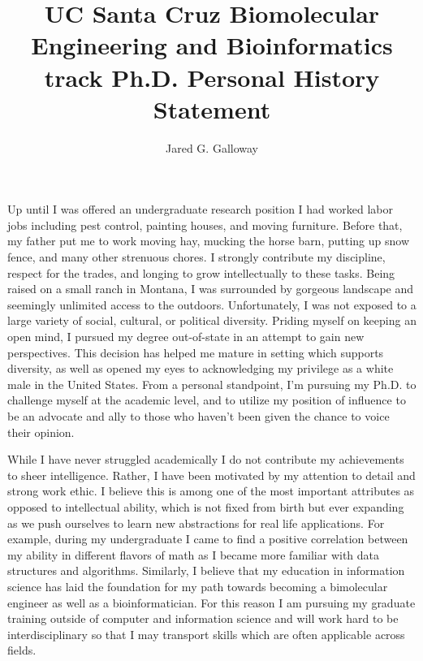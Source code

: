 \documentclass[11pt]{amsart}
\title{UC Santa Cruz Biomolecular Engineering and Bioinformatics track Ph.D. Personal History Statement}
\author{Jared G. Galloway}
\newcommand{\sepspace}{\vspace*{1em}}		%
\begin{document}
\maketitle


Up until I was offered an undergraduate research position I had worked labor jobs including pest control, painting houses, and moving furniture.
Before that, my father put me to work moving hay, mucking the horse barn, putting up snow fence, and many other strenuous chores.
I strongly contribute my discipline, respect for the trades, and longing to grow intellectually to these tasks.
Being raised on a small ranch in Montana,
I was surrounded by gorgeous landscape and seemingly unlimited access to the outdoors. 
Unfortunately, I was not exposed to a large variety of social, cultural, or political diversity. 
Priding myself on keeping an open mind, I pursued my degree out-of-state in an attempt to gain new perspectives.
This decision has helped me mature in setting which supports diversity, as well as opened my eyes to acknowledging my privilege as a white male in the United States.
From a personal standpoint, I'm pursuing my Ph.D. to 
challenge myself at the academic level, 
and to utilize my position of influence to be an advocate and ally to those who haven't been given the chance to voice their opinion.
\sepspace

While I have never struggled academically I do not contribute my achievements to sheer intelligence. 
Rather, I have been motivated by my attention to detail and strong work ethic.
I believe this is among one of the most important attributes as opposed to intellectual ability, which is not fixed from birth but ever expanding as we push ourselves to learn new abstractions for real life applications.
For example, during my undergraduate I came to find a positive correlation between my ability in different flavors of math as I became more familiar with data structures and algorithms. 
Similarly, I believe that my education in information science has laid the foundation for my path towards becoming a bimolecular engineer as well as a bioinformatician.
For this reason I am pursuing my graduate training outside of computer and information science
and will work hard to be interdisciplinary so that I may transport skills which are often applicable across fields. 
\sepspace
\end{document}
